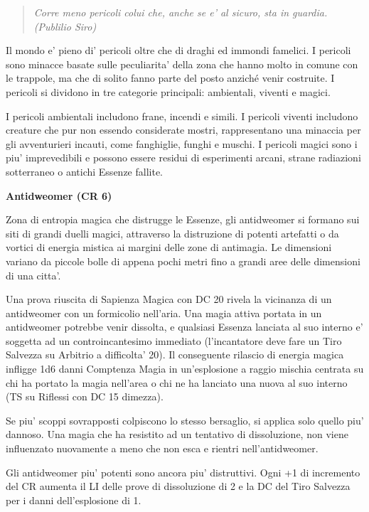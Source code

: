 \documentclass[a4paper,11pt,twoside,openany]{book}
\begin{document}
{		
		\label{pericoli-in-avventura}
		\begin{quote}\textit{Corre meno pericoli colui che, anche se e' al sicuro, sta in guardia. (Publilio Siro)
		}\end{quote}
		Il mondo e' pieno di' pericoli oltre che di draghi ed immondi famelici. I pericoli sono minacce basate sulle peculiarita' della zona che hanno molto in comune con le trappole, ma che di solito fanno parte del posto anziché venir costruite. I pericoli si dividono in tre categorie principali: ambientali, viventi e magici.
		
		I pericoli ambientali includono frane, incendi e simili. I pericoli viventi includono creature che pur non essendo considerate mostri, rappresentano una minaccia per gli av­venturieri incauti, come fanghiglie, funghi e muschi. I pericoli magici sono i piu' imprevedibili e possono essere residui di esperimenti arcani, strane radiazioni sotterraneo o antichi Essenze fallite.
		
		\textbf{Antidweomer (CR 6)}
		
		Zona di entropia magica che distrugge le Essenze, gli antidweomer si formano sui siti di grandi duelli magici, attraverso la distruzione di potenti artefatti o da vortici di energia mistica ai margini delle zone di antimagia. Le dimensioni variano da piccole bolle di appena pochi metri fino a grandi aree delle dimensioni di una citta'. 
		
		Una prova riuscita di Sapienza Magica con DC 20 rivela la vicinanza di un antidweomer con un formicolio nell'aria. Una magia attiva portata in un antidweomer potrebbe venir dissolta, e qualsiasi Essenza lanciata al suo interno e' soggetta ad un controincantesimo immediato (l'incantatore deve fare un Tiro Salvezza su Arbitrio a difficolta' 20). Il conseguente rilascio di energia magica infligge 1d6 danni Comptenza Magia in un'esplosione a raggio mischia centrata su chi ha portato la magia nell'area o chi ne ha lanciato una nuova al suo interno (TS su Riflessi con DC 15 dimezza).
		
		Se piu' scoppi sovrapposti colpiscono lo stesso bersaglio, si applica solo quello piu' dannoso. Una magia che ha resistito ad un tentativo di dissoluzione, non viene influenzato nuovamente a meno che non esca e rientri nell'antidweomer.
		
		Gli antidweomer piu' potenti sono ancora piu' distruttivi. Ogni +1 di incremento del CR aumenta il LI delle prove di dissoluzione di 2 e la DC del Tiro Salvezza per i danni dell'esplosione di 1.
		
}
\end{document}
